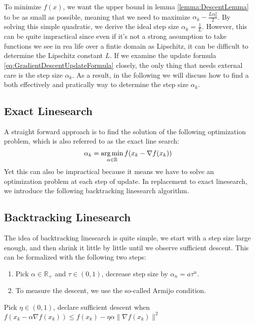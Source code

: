 To minimize $f(x)$, we want the upper bound in lemma \ref{lemma:DescentLemma} to be as small as possible, meaning that we need to maximize $\alpha_k - \frac{L\alpha_k^2}{2}$. By solving this simple quadratic, we derive the ideal step size $\alpha_k = \frac{1}{L}$. However, this can be quite impractical since even if it's not a strong assumption to take functions we see in rea life over a fintie domain as Lipschitz, it can be difficult to determine the Lipschitz constant $L$. If we examine the update formula \ref{eq:GradientDescentUpdateFormula} closely, the only thing that needs external care is the step size $\alpha_k$. As a result, in the following we will discuss how to find a both effectively and pratically way to determine the step size $\alpha_k$.

\subsection{Exact Linesearch}

A straight forward approach is to find the solution of the following optimization problem, which is also referred to as the exact line search:
\begin{equation*}
    \alpha_k = \operatorname*{arg\,min}_{\alpha \in \mathbb{R}}f(x_k - \nabla f(x_k))
\end{equation*}
Yet this can also be impractical because it means we have to solve an optimization problem at each step of update. In replacement to exact linesearch, we introduce the following backtracking linesearch algorithm.

\subsection{Backtracking Linesearch}
The idea of backtracking linesearch is quite simple, we start with a step size large enough, and then shrink it little by little until we observe sufficient descent. This can be formalized with the following two steps:
\begin{enumerate}
    \item Pick $\alpha \in \mathbb{R}_+$ and $\tau \in (0,1)$, decrease step size by $\alpha_n = a\tau^n$.
    \item To measure the descent, we use the so-called Armijo condition.
\end{enumerate}
\begin{definition}
    Pick $\eta \in (0,1)$, declare sufficient descent when $f(x_k - \alpha\nabla f(x_k)) \leq f(x_k) - \eta\alpha\|\nabla f(x_k)\|^2$
\end{definition}

